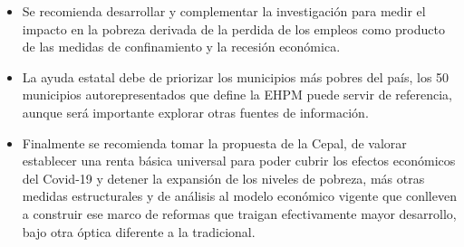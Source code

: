 \begin{itemize}
	\item Se recomienda desarrollar y complementar la investigación para medir el impacto en la pobreza derivada de la perdida de los empleos como producto de las medidas de confinamiento y la recesión económica.
	\item La ayuda estatal debe de priorizar los municipios más pobres del país, los 50 municipios autorepresentados que define la EHPM puede servir de referencia, aunque será importante explorar otras fuentes de información. 
	\item Finalmente se recomienda tomar la propuesta de la Cepal, de valorar establecer una renta básica universal para poder cubrir los efectos económicos del Covid-19 y detener la expansión de los niveles de pobreza, más otras medidas estructurales y de análisis al modelo económico vigente que conlleven a construir ese marco de reformas que traigan efectivamente mayor desarrollo, bajo otra óptica diferente a la tradicional.

\end{itemize}

